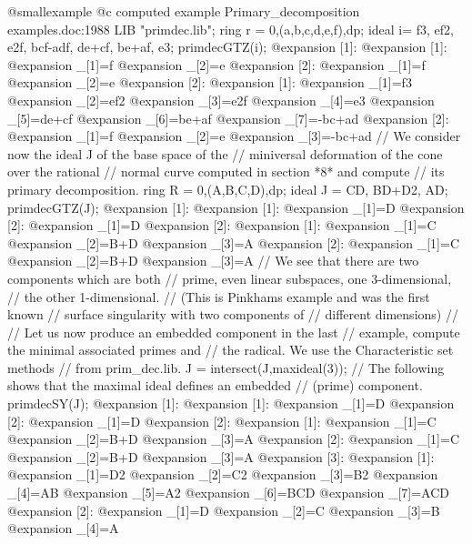 @smallexample
@c computed example Primary_decomposition examples.doc:1988 
  LIB "primdec.lib";
  ring r = 0,(a,b,c,d,e,f),dp;
  ideal i= f3, ef2, e2f, bcf-adf, de+cf, be+af, e3;
  primdecGTZ(i);
@expansion{} [1]:
@expansion{}    [1]:
@expansion{}       _[1]=f
@expansion{}       _[2]=e
@expansion{}    [2]:
@expansion{}       _[1]=f
@expansion{}       _[2]=e
@expansion{} [2]:
@expansion{}    [1]:
@expansion{}       _[1]=f3
@expansion{}       _[2]=ef2
@expansion{}       _[3]=e2f
@expansion{}       _[4]=e3
@expansion{}       _[5]=de+cf
@expansion{}       _[6]=be+af
@expansion{}       _[7]=-bc+ad
@expansion{}    [2]:
@expansion{}       _[1]=f
@expansion{}       _[2]=e
@expansion{}       _[3]=-bc+ad
  // We consider now the ideal J of the base space of the
  // miniversal deformation of the cone over the rational
  // normal curve computed in section *8* and compute
  // its primary decomposition.
  ring R = 0,(A,B,C,D),dp;
  ideal J = CD, BD+D2, AD;
  primdecGTZ(J);
@expansion{} [1]:
@expansion{}    [1]:
@expansion{}       _[1]=D
@expansion{}    [2]:
@expansion{}       _[1]=D
@expansion{} [2]:
@expansion{}    [1]:
@expansion{}       _[1]=C
@expansion{}       _[2]=B+D
@expansion{}       _[3]=A
@expansion{}    [2]:
@expansion{}       _[1]=C
@expansion{}       _[2]=B+D
@expansion{}       _[3]=A
  // We see that there are two components which are both
  // prime, even linear subspaces, one 3-dimensional,
  // the other 1-dimensional.
  // (This is Pinkhams example and was the first known
  // surface singularity with two components of
  // different dimensions)
  //
  // Let us now produce an embedded component in the last
  // example, compute the minimal associated primes and
  // the radical. We use the Characteristic set methods
  // from prim_dec.lib.
  J = intersect(J,maxideal(3));
  // The following shows that the maximal ideal defines an embedded
  // (prime) component.
  primdecSY(J);
@expansion{} [1]:
@expansion{}    [1]:
@expansion{}       _[1]=D
@expansion{}    [2]:
@expansion{}       _[1]=D
@expansion{} [2]:
@expansion{}    [1]:
@expansion{}       _[1]=C
@expansion{}       _[2]=B+D
@expansion{}       _[3]=A
@expansion{}    [2]:
@expansion{}       _[1]=C
@expansion{}       _[2]=B+D
@expansion{}       _[3]=A
@expansion{} [3]:
@expansion{}    [1]:
@expansion{}       _[1]=D2
@expansion{}       _[2]=C2
@expansion{}       _[3]=B2
@expansion{}       _[4]=AB
@expansion{}       _[5]=A2
@expansion{}       _[6]=BCD
@expansion{}       _[7]=ACD
@expansion{}    [2]:
@expansion{}       _[1]=D
@expansion{}       _[2]=C
@expansion{}       _[3]=B
@expansion{}       _[4]=A
